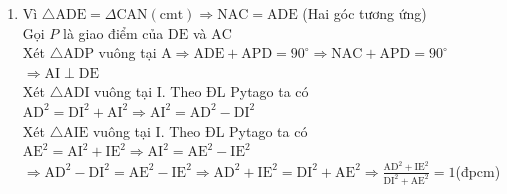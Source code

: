 \begin{bt}
{\begin{enumerate}
        $\Rightarrow \mathrm{AB}=\mathrm{CN}$ (hai cạnh tương ứng), $A B M=N C M$ (Hai góc tương ứng)\\[4pt]
        Ta có $\mathrm{ACN}=\mathrm{ACB}+\mathrm{BCN}=\mathrm{ACB}+\mathrm{ABC}=180^{\circ}-\mathrm{BAC}$\\[4pt]
        Lại có $\mathrm{DAE}=\mathrm{DAC}+\mathrm{BAE}-\mathrm{BAC}=180^{\circ}-\mathrm{BAC}$\\[5pt]
        $\Rightarrow \mathrm{DAE}=\mathrm{ACN}$\\[4pt]
        Xét $\triangle \mathrm{ADE}$ và $\triangle \mathrm{ACN}$ có $\mathrm{CN}=\mathrm{AE}$ (cùng bằng $\mathrm{AB}$ )\\[5pt]
        $\mathrm{AC}=\mathrm{AD}(\mathrm{gt})$
        $\mathrm{DAE}=\mathrm{ACN} (\mathrm{cmt}) \\[4pt]
        \Rightarrow \triangle \mathrm{ADE}=\triangle \mathrm{CAN} \text { (c.g.c) }$
        \item  $\text{Vì } \triangle \mathrm{ADE}=\Delta \mathrm{CAN}(\mathrm{cmt}) \Rightarrow \mathrm{NAC}=\mathrm{ADE}$ (Hai góc tương ứng)\\[5pt]
        Gọi $P$ là giao điểm của $\mathrm{DE}$ và $\mathrm{AC}$\\[5pt]
        Xét $\triangle \mathrm{ADP}$ vuông tại $\mathrm{A} \Rightarrow \mathrm{ADE}+\mathrm{APD}=90^{\circ} \Rightarrow \mathrm{NAC}+\mathrm{APD}=90^{\circ}$ $\Rightarrow \mathrm{AI} \perp \mathrm{DE}$\\[5pt]
        Xét $\triangle \mathrm{ADI}$ vuông tại I. Theo ĐL Pytago ta có $\mathrm{AD}^2=\mathrm{DI}^2+\mathrm{AI}^2 \Rightarrow \mathrm{AI}^2=\mathrm{AD}^2-\mathrm{DI}^2$\\[5pt] Xét $\triangle \mathrm{AIE}$ vuông tại I. Theo ĐL Pytago ta có $\mathrm{AE}^2=\mathrm{AI}^2+\mathrm{IE}^2 \Rightarrow \mathrm{AI}^2=\mathrm{AE}^2-\mathrm{IE}^2$\\[5pt] $\Rightarrow \mathrm{AD}^2-\mathrm{DI}^2=\mathrm{AE}^2-\mathrm{IE}^2 \Rightarrow \mathrm{AD}^2+\mathrm{IE}^2=\mathrm{DI}^2+\mathrm{AE}^2 \Rightarrow \frac{\mathrm{AD}^2+\mathrm{IE}^2}{\mathrm{DI}^2+\mathrm{AE}^2}=1$(đpcm)
    \end{enumerate}
}
\end{bt}